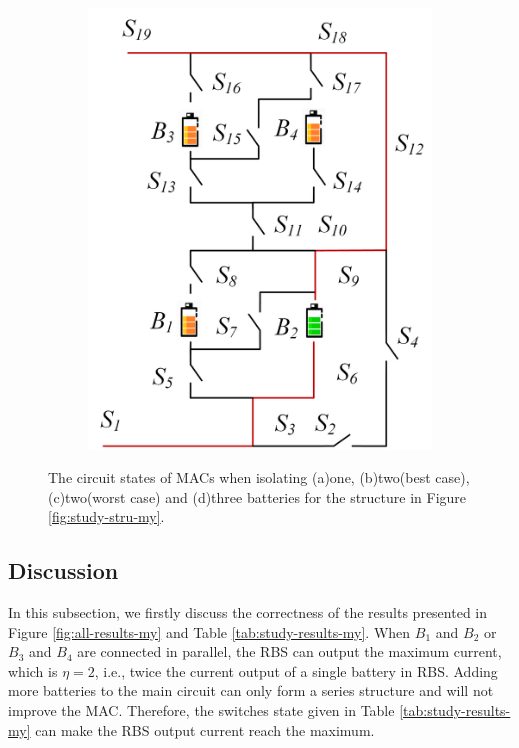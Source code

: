 \documentclass{article}
\begin{document}
\begin{figure}[htbp]
\begin{subfigure}[b]{0.31\textwidth}
          \includegraphics[width=\textwidth]{my-isolated-3.png}
          \caption{}
          \label{fig:my-isolated-3}
      \end{subfigure}
      \caption{
          The circuit states of MACs when isolating (a)one, (b)two(best case), (c)two(worst case) and (d)three batteries for the structure in Figure \ref{fig:study-stru-my}.
          }
  \end{figure}

\subsection{Discussion}

In this subsection, we firstly discuss the correctness of the results presented in Figure \ref{fig:all-results-my} and Table \ref{tab:study-results-my}. 
When $B_1$ and $B_2$ or $B_3$ and $B_4$ are connected in parallel, the RBS can output the maximum current, which is $\eta=2$, i.e., twice the current output of a single battery in RBS. 
Adding more batteries to the main circuit can only form a series structure and will not improve the MAC. 
Therefore, the switches state given in Table \ref{tab:study-results-my} can make the RBS output current reach the maximum.
\end{document}
